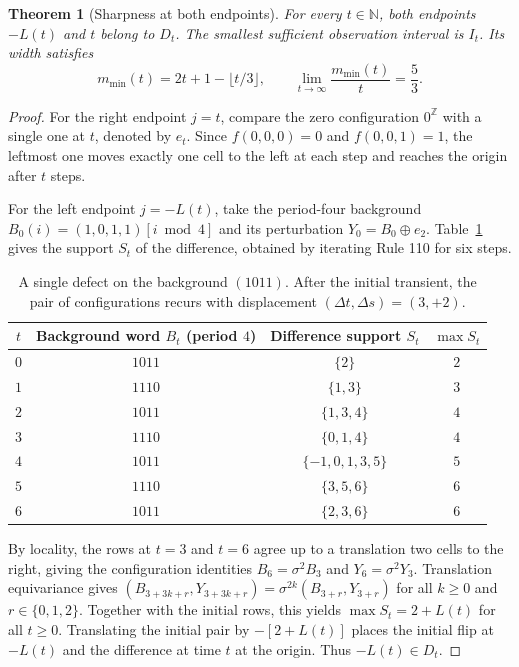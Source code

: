 \documentclass[11pt, a4paper]{article}
\newtheorem{theorem}{Theorem}[section]
\begin{document}
\begin{theorem}[Sharpness at both endpoints]\label{thm:sharpness}
For every $t \in \mathbb{N}$, both endpoints $-L(t)$ and $t$ belong to $D_t$. The smallest sufficient observation interval is $I_t$. Its width satisfies
\begin{equation}
m_{\min}(t) = 2t + 1 - \lfloor t/3 \rfloor, \qquad \lim_{t \to \infty} \frac{m_{\min}(t)}{t} = \frac{5}{3}.
\end{equation}
\end{theorem}

\begin{proof}
For the right endpoint $j = t$, compare the zero configuration $0^{\mathbb{Z}}$ with a single one at $t$, denoted by $e_t$. Since $f(0, 0, 0) = 0$ and $f(0, 0, 1) = 1$, the leftmost one moves exactly one cell to the left at each step and reaches the origin after $t$ steps.

For the left endpoint $j = -L(t)$, take the period-four background $B_0(i) = (1, 0, 1, 1)[i \bmod 4]$ and its perturbation $Y_0 = B_0 \oplus e_2$. Table~\ref{tab:period4_defect} gives the support $S_t$ of the difference, obtained by iterating Rule 110 for six steps.

\begin{table}[h]
\centering
\caption{A single defect on the background $(1011)$. After the initial transient, the pair of configurations recurs with displacement $(\Delta t, \Delta s) = (3, +2)$.}
\label{tab:period4_defect}
\begin{tabular}{cccc}
\toprule
$t$ & Background word $B_t$ (period $4$) & Difference support $S_t$ & $\max S_t$ \\
\midrule
$0$ & $1011$ & $\{2\}$ & $2$ \\
$1$ & $1110$ & $\{1, 3\}$ & $3$ \\
$2$ & $1011$ & $\{1, 3, 4\}$ & $4$ \\
$3$ & $1110$ & $\{0, 1, 4\}$ & $4$ \\
$4$ & $1011$ & $\{-1, 0, 1, 3, 5\}$ & $5$ \\
$5$ & $1110$ & $\{3, 5, 6\}$ & $6$ \\
$6$ & $1011$ & $\{2, 3, 6\}$ & $6$ \\
\bottomrule
\end{tabular}
\end{table}

By locality, the rows at $t=3$ and $t=6$ agree up to a translation two cells to the right, giving the configuration identities $B_6 = \sigma^2 B_3$ and $Y_6 = \sigma^2 Y_3$. Translation equivariance gives $(B_{3+3k+r}, Y_{3+3k+r}) = \sigma^{2k}(B_{3+r}, Y_{3+r})$ for all $k \ge 0$ and $r \in \{0, 1, 2\}$. Together with the initial rows, this yields $\max S_t = 2 + L(t)$ for all $t \ge 0$. Translating the initial pair by $-[2 + L(t)]$ places the initial flip at $-L(t)$ and the difference at time $t$ at the origin. Thus $-L(t) \in D_t$.
\end{proof}
\end{document}
